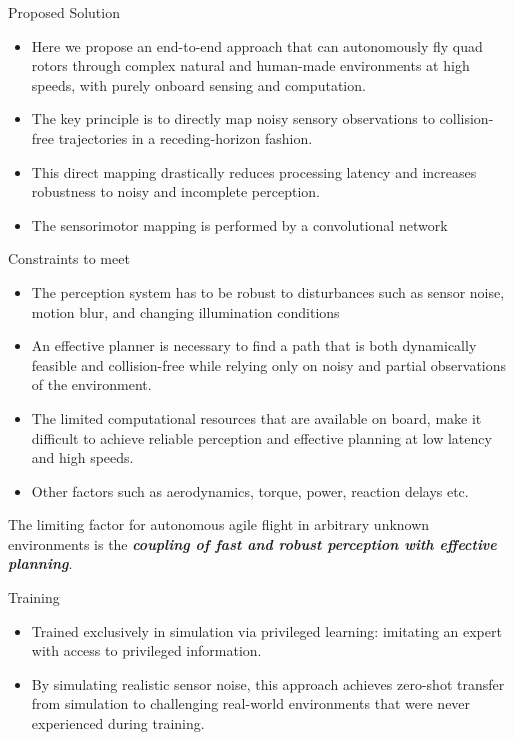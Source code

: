 \documentclass{beamer}
\begin{document}
\begin{frame}{Proposed Solution}
	\begin{itemize}
		\item Here we propose an end-to-end approach that can autonomously fly quad rotors through complex natural and human-made environments at high speeds, with purely onboard sensing and computation.
		
		\item The key principle is to directly map noisy sensory observations to collision-free trajectories in a receding-horizon \autocite{receding_horizon} fashion. 
		
		\item This direct mapping drastically reduces processing latency and increases robustness to noisy and incomplete perception. 
		
		\item The sensorimotor mapping is performed by a convolutional network
	\end{itemize}
\end{frame}

\begin{frame}{Constraints to meet}
	\begin{itemize}
		\item The perception system has to be robust to disturbances such as sensor noise, motion blur, and changing illumination conditions
		\item An effective planner is necessary to find a path that is both dynamically feasible and collision-free while relying only on noisy and partial observations of the environment.
		\item The limited computational resources that are available on board, make it difficult to achieve reliable perception and effective planning at low latency and high speeds.
		\item Other factors such as aerodynamics, torque, power, reaction delays etc.
	\end{itemize}
	The limiting factor for autonomous agile flight in arbitrary unknown environments is the \textbf{\textit{coupling of fast and robust perception with effective planning}}.
\end{frame}

\begin{frame}{Training}
	\begin{itemize}
		\item Trained exclusively in simulation via privileged learning: imitating an expert with access to privileged information. 
		\item By simulating realistic sensor noise, this approach achieves zero-shot transfer from simulation to challenging real-world environments that were never experienced during training.		
	\end{itemize}
\end{frame}
\end{document}
